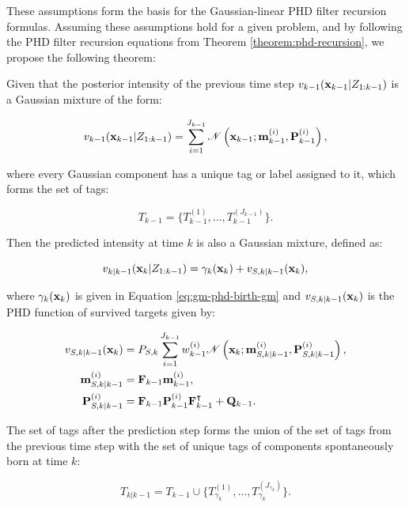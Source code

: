 These assumptions form the basis for the Gaussian-linear PHD filter recursion formulas. Assuming these assumptions hold for a given problem, and by following the PHD filter recursion equations from Theorem \ref{theorem:phd-recursion}, we propose the following theorem:

\begin{theorem}\label{theorem:gm-phd-prediction}
    Given that the posterior intensity of the previous time step $v_{k-1}(\vecat{x}{k-1} | Z_{1:k-1})$ is a Gaussian mixture of the form:

    \begin{equation}
        v_{k-1}(\vecat{x}{k-1} | Z_{1:k-1}) = \sum_{i=1}^{J_{k-1}}
        \mathscr{N}\left(\vecat{x}{k-1}; \vecat{m}{k-1}^{(i)}, \vecat{P}{k-1}^{(i)}\right),
    \end{equation}

    \noindent where every Gaussian component has a unique tag or label assigned to it, which forms the set of tags:

    \begin{equation}
        T_{k-1} = \{ T_{k-1}^{(1)}, \ldots, T_{k-1}^{(J_{k-1})} \}.
    \end{equation}

    \noindent Then the predicted intensity at time $k$ is also a Gaussian mixture, defined as:

    \begin{equation}
        v_{k|k-1}(\vecat{x}{k} | Z_{1:k-1}) = \gamma_k(\vecat{x}{k}) + v_{S, k|k-1}(\vecat{x}{k}),
    \end{equation}

    \noindent where $\gamma_k(\vecat{x}{k})$ is given in Equation \ref{eq:gm-phd-birth-gm} and $v_{S, k|k-1}(\vecat{x}{k})$ is the PHD function of survived targets given by:

    \begin{align}
        v_{S, k|k-1}(\vecat{x}{k})
        &= P_{S,k} \sum_{i=1}^{J_{k-1}} w_{k-1}^{(i)}
            \mathscr{N}\left(\vecat{x}{k}; \vecat{m}{S,k|k-1}^{(i)}, \vecat{P}{S,k|k-1}^{(i)}\right), \\
        \vecat{m}{S,k|k-1}^{(i)}
        &= \vecat{F}{k-1}\vecat{m}{k-1}^{(i)}, \\
        \vecat{P}{S,k|k-1}^{(i)}
        &= \vecat{F}{k-1} \vecat{P}{k-1}^{(i)} \vecat{F}{k-1}^\intercal + \vecat{Q}{k-1}.
    \end{align}

    The set of tags after the prediction step forms the union of the set of tags from the previous time step with the set of unique tags of components spontaneously born at time $k$:

    \begin{equation}
        T_{k|k-1} = T_{k-1} \cup \{ T_{\gamma_k}^{(1)}, \ldots, T_{\gamma_k}^{(J_{\gamma_k})} \}.
    \end{equation}
\end{theorem}

